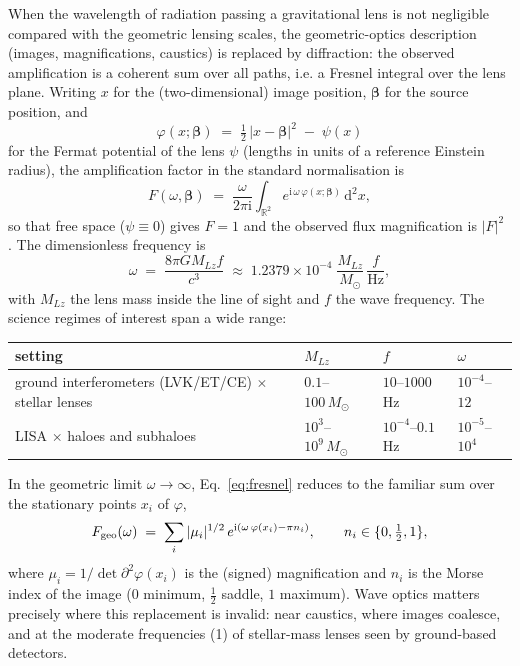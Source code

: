 \documentclass[11pt,a4paper]{article}
\newcommand{\Fresnel}{F}
\newcommand{\ii}{\mathrm{i}}
\newcommand{\dd}{\mathrm{d}}
\newcommand{\R}{\mathbb{R}}
\newcommand{\ie}{i.e.}
\begin{document}
When the wavelength of radiation passing a gravitational lens is not
negligible compared with the geometric lensing scales, the geometric-optics
description (images, magnifications, caustics) is replaced by diffraction:
the observed amplification is a coherent sum over all paths, \ie{} a Fresnel
integral over the lens plane.  Writing $x$ for the (two-dimensional) image
position, $\boldsymbol\beta$ for the source position, and
\begin{equation}
  \varphi(x;\boldsymbol\beta)
  \;=\; \tfrac12\,|x-\boldsymbol\beta|^2 \;-\; \psi(x)
  \label{eq:fermat}
\end{equation}
for the Fermat potential of the lens $\psi$ (lengths in units of a reference
Einstein radius), the amplification factor in the standard normalisation is
\begin{equation}
  \Fresnel(\omega,\boldsymbol\beta)
  \;=\; \frac{\omega}{2\pi\ii}\int_{\R^2}
  e^{\ii\,\omega\,\varphi(x;\boldsymbol\beta)}\,\dd^2 x,
  \label{eq:fresnel}
\end{equation}
so that free space ($\psi \equiv 0$) gives $\Fresnel = 1$ and the observed
flux magnification is $|\Fresnel|^2$ \cite{DeguchiWatson1986,Nakamura1998,TakahashiNakamura2003}.
The dimensionless frequency is
\begin{equation}
  \omega \;=\; \frac{8\pi G M_{Lz} f}{c^3}
  \;\approx\; 1.2379\times 10^{-4}\;
  \frac{M_{Lz}}{M_\odot}\,\frac{f}{\mathrm{Hz}},
  \label{eq:omega}
\end{equation}
with $M_{Lz}$ the lens mass inside the line of sight and $f$ the wave
frequency.  The science regimes of interest span a wide range:

\begin{center}
\small
\begin{tabular}{@{}>{\raggedright\arraybackslash}p{6.2cm}lll@{}}
\toprule
setting & $M_{Lz}$ & $f$ & $\omega$ \\
\midrule
ground interferometers (LVK/ET/CE) $\times$ stellar lenses
  & $0.1$--$100\,M_\odot$ & $10$--$1000$\,Hz & $10^{-4}$--$12$\\
LISA $\times$ haloes and subhaloes
  & $10^{3}$--$10^{9}\,M_\odot$ & $10^{-4}$--$0.1$\,Hz & $10^{-5}$--$10^{4}$\\
\bottomrule
\end{tabular}
\end{center}

In the geometric limit $\omega\to\infty$, Eq.~\eqref{eq:fresnel} reduces to
the familiar sum over the stationary points $x_i$ of $\varphi$,
\begin{equation}
  \Fresnel_{\rm geo}(\omega)
  \;=\; \sum_i |\mu_i|^{1/2}\,
  e^{\ii\left(\omega\,\varphi(x_i) - \pi n_i\right)},
  \qquad n_i \in \{0,\tfrac12,1\},
  \label{eq:geo}
\end{equation}
where $\mu_i = 1/\det \partial^2\varphi(x_i)$ is the (signed) magnification
and $n_i$ is the Morse index of the image ($0$ minimum, $\tfrac12$ saddle,
$1$ maximum).  Wave optics matters precisely where this replacement is
invalid: near caustics, where images coalesce, and at the moderate
frequencies (1) of stellar-mass lenses seen by ground-based detectors.
\end{document}
